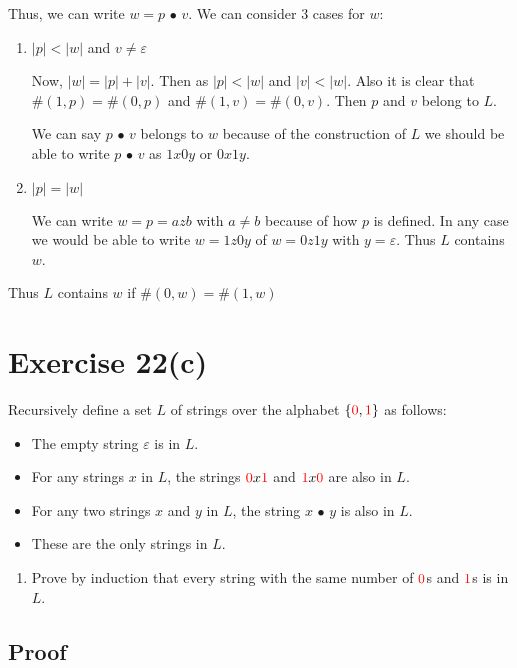 \documentclass[12pt]{article}
\begin{document}
Thus, we can write $w=p \text{ • } v$. We can consider 3 cases for $w$:
\begin{enumerate}
    \item $|p|<|w|$ and $v\neq\varepsilon$

        Now, $|w|=|p|+|v|$. Then as $|p|<|w|$ and $|v|<|w|$. Also it is clear that $\#(1,p)=\#(0,p)$ and $\#(1,v)=\#(0,v)$. Then $p$ and $v$ belong to $L$.

        We can say $p \text{ • } v$ belongs to $w$ because of the construction of $L$ we should be able to write $p \text{ • } v$ as $1x0y$ or $0x1y$.

    \item $|p|=|w|$

        We can write $w=p=azb$ with $a \neq b$ because of how $p$ is defined. In any case we would be able to write $w=1z0y$ of $w=0z1y$ with $y=\varepsilon$. Thus $L$ contains $w$.

\end{enumerate}

Thus $L$ contains $w$ if $\#(0,w)=\#(1,w)$

\section{Exercise 22(c)}
Recursively define a set $L$ of strings over the alphabet $\{ \textcolor{red}{0} , \textcolor{red}{1} \}$ as follows:
\begin{itemize}
    \item The empty string $\varepsilon$ is in $L$.
    \item For any strings $x$ in $L$, the strings $\textcolor{red}{0} x \textcolor{red}{1}$ and $\textcolor{red}{1} x \textcolor{red}{0}$ are also in $L$.
    \item For any two strings $x$ and $y$ in $L$, the string $x \text{ • } y$ is also in $L$.
    \item These are the only strings in $L$.
\end{itemize}

\begin{enumerate}
[label=\alph*), start=3]
    \item Prove by induction that every string with the same number of $\textcolor{red}{0}$s and $\textcolor{red}{1}$s is in$L$.
\end{enumerate}

\setcounter{subsection}{2}

\subsection{Proof}
\end{document}
